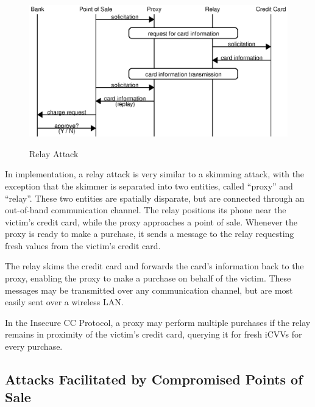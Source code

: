 \begin{figure}
  \caption{Relay Attack}
  \centering
    \includegraphics{img/attack-3-relay.eps}
  \label{fig:insecure-relay}
\end{figure}

In implementation, a relay attack is very similar to a skimming attack, with the exception that the skimmer is separated into two entities, called ``proxy'' and ``relay''.
These two entities are spatially disparate, but are connected through an out-of-band communication channel.
The relay positions its phone near the victim's credit card, while the proxy approaches a point of sale.
Whenever the proxy is ready to make a purchase, it sends a message to the relay requesting fresh values from the victim's credit card.

The relay skims the credit card and forwards the card's information back to the proxy, enabling the proxy to make a purchase on behalf of the victim.
These messages may be transmitted over any communication channel, but are most easily sent over a wireless LAN.

In the Insecure CC Protocol, a proxy may perform multiple purchases if the relay remains in proximity of the victim's credit card, querying it for fresh iCVVs for every purchase.





\subsection{Attacks Facilitated by Compromised Points of Sale}
\label{sec:insecure-compromised}

